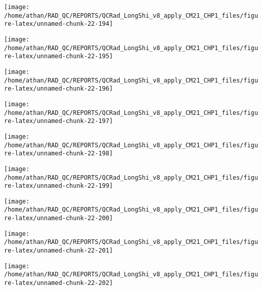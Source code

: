 \documentclass[
  10pt,
  a4paper,oneside]{article}
\begin{document}
\begin{center}\texttt{[image: /home/athan/RAD\_QC/REPORTS/QCRad\_LongShi\_v8\_apply\_CM21\_CHP1\_files/figure-latex/unnamed-chunk-22-194]} \end{center}

\begin{center}\texttt{[image: /home/athan/RAD\_QC/REPORTS/QCRad\_LongShi\_v8\_apply\_CM21\_CHP1\_files/figure-latex/unnamed-chunk-22-195]} \end{center}

\begin{center}\texttt{[image: /home/athan/RAD\_QC/REPORTS/QCRad\_LongShi\_v8\_apply\_CM21\_CHP1\_files/figure-latex/unnamed-chunk-22-196]} \end{center}

\begin{center}\texttt{[image: /home/athan/RAD\_QC/REPORTS/QCRad\_LongShi\_v8\_apply\_CM21\_CHP1\_files/figure-latex/unnamed-chunk-22-197]} \end{center}

\begin{center}\texttt{[image: /home/athan/RAD\_QC/REPORTS/QCRad\_LongShi\_v8\_apply\_CM21\_CHP1\_files/figure-latex/unnamed-chunk-22-198]} \end{center}

\begin{center}\texttt{[image: /home/athan/RAD\_QC/REPORTS/QCRad\_LongShi\_v8\_apply\_CM21\_CHP1\_files/figure-latex/unnamed-chunk-22-199]} \end{center}

\begin{center}\texttt{[image: /home/athan/RAD\_QC/REPORTS/QCRad\_LongShi\_v8\_apply\_CM21\_CHP1\_files/figure-latex/unnamed-chunk-22-200]} \end{center}

\begin{center}\texttt{[image: /home/athan/RAD\_QC/REPORTS/QCRad\_LongShi\_v8\_apply\_CM21\_CHP1\_files/figure-latex/unnamed-chunk-22-201]} \end{center}

\begin{center}\texttt{[image: /home/athan/RAD\_QC/REPORTS/QCRad\_LongShi\_v8\_apply\_CM21\_CHP1\_files/figure-latex/unnamed-chunk-22-202]} \end{center}
\end{document}
